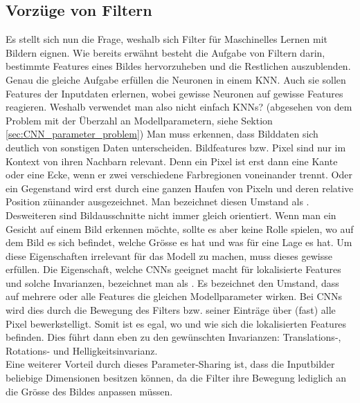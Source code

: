 \subsection{Vorzüge von Filtern}
Es stellt sich nun die Frage, weshalb sich Filter für Maschinelles
Lernen mit Bildern eignen.
Wie bereits erwähnt besteht die Aufgabe von Filtern darin, bestimmte Features
eines Bildes hervorzuheben und die Restlichen auszublenden. Genau die gleiche
Aufgabe erfüllen die Neuronen in einem KNN. Auch sie sollen Features der
Inputdaten erlernen, wobei gewisse Neuronen auf gewisse Features reagieren.
Weshalb verwendet man also nicht einfach KNNs? (abgesehen
von dem Problem mit der Überzahl an Modellparametern, siehe Sektion \ref{sec:CNN_parameter_problem})
\para{}
Man muss erkennen, dass Bilddaten sich deutlich von sonstigen Daten unterscheiden.
Bildfeatures bzw. Pixel sind nur im Kontext von ihren Nachbarn relevant. Denn
ein Pixel ist erst dann eine Kante oder eine Ecke, wenn er zwei verschiedene
Farbregionen voneinander trennt. Oder ein Gegenstand wird erst durch eine ganzen Haufen
von Pixeln und deren relative Position züinander ausgezeichnet.
Man bezeichnet diesen Umstand als .
\para{}
Desweiteren sind Bildausschnitte nicht immer gleich
orientiert. Wenn man ein Gesicht auf einem Bild erkennen möchte, sollte es aber
keine Rolle spielen, wo auf dem Bild es sich befindet, welche Grösse es
hat und was für eine Lage es hat. Um diese Eigenschaften irrelevant für das
Modell zu machen, muss dieses gewisse  erfüllen.
\para{}
Die Eigenschaft, welche CNNs geeignet macht für lokalisierte Features und
solche Invarianzen, bezeichnet man als .
Es bezeichnet den Umstand, dass auf
mehrere oder alle Features die gleichen Modellparameter wirken. Bei CNNs wird
dies durch die Bewegung des Filters bzw. seiner Einträge über (fast) alle
Pixel bewerkstelligt. Somit ist
es egal, wo und wie sich die lokalisierten Features befinden. Dies führt dann eben zu
den gewünschten Invarianzen: Translations-, Rotations- und
Helligkeitsinvarianz. \\
Eine weiterer Vorteil durch dieses Parameter-Sharing ist, dass die Inputbilder
beliebige Dimensionen besitzen können, da die Filter ihre Bewegung lediglich an
die Grösse des Bildes anpassen müssen.

\cite{deeplearning.ai:cnn}

